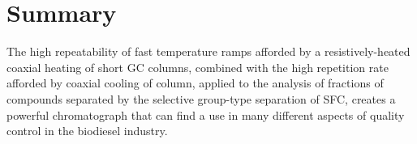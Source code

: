 \section{Summary}

The high repeatability of fast temperature ramps afforded by a
resistively-heated coaxial heating of short GC columns, combined with the high
repetition rate afforded by coaxial cooling of column, applied to the analysis
of fractions of compounds separated by the selective group-type separation of
SFC, creates a powerful chromatograph that can find a use in many different
aspects of quality control in the biodiesel industry.

